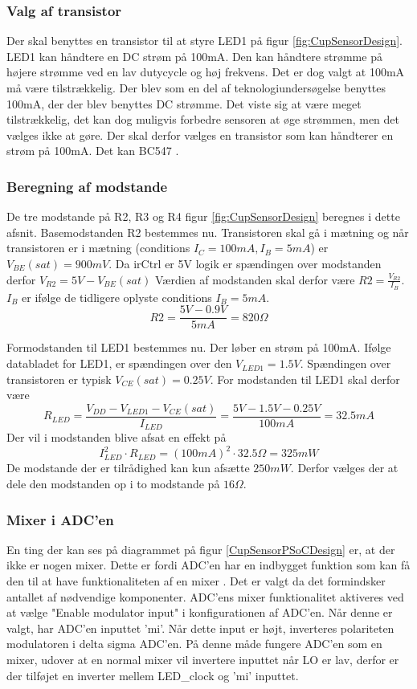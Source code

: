 \documentclass[HardwareDesign/HardwareDesign_main.tex]{subfiles}
\begin{document}
\subsubsection{Valg af transistor}
Der skal benyttes en transistor til at styre LED1 på figur \ref{fig:CupSensorDesign}. LED1 kan håndtere en DC strøm på 100mA\autocite[7]{SFH485}. Den kan håndtere strømme på højere strømme ved en lav dutycycle og høj frekvens. Det er dog valgt at 100mA må være tilstrækkelig. Der blev som en del af teknologiundersøgelse benyttes 100mA, der der blev benyttes DC strømme. Det viste sig at være meget tilstrækkelig, det kan dog muligvis forbedre sensoren at øge strømmen, men det vælges ikke at gøre. 
Der skal derfor vælges en transistor som kan håndterer en strøm på 100mA. Det kan BC547 \autocite[2]{BC547}.

\subsubsection{Beregning af modstande}
De tre modstande på R2, R3 og R4 figur \ref{fig:CupSensorDesign} beregnes i dette afsnit. Basemodstanden R2 bestemmes nu. Transistoren skal gå i mætning og når transistoren er i mætning (conditions $I_C = 100\si{mA}, I_B = 5\si{mA}$) er $V_{BE}(sat)=900mV$\autocite[2]{BC547}. Da irCtrl er 5V logik er spændingen over modstanden derfor $V_{R2} = 5\si{V}-V_{BE}(sat)$
Værdien af modstanden skal derfor være $R2 = \frac{V_{R2}}{I_B}$. $I_B$ er ifølge de tidligere oplyste conditions $I_B = 5\si{mA}$.
$$R2=\frac{5\si{V} - 0.9\si{V}}{5\si{mA}} = 820\si{\Omega}$$

Formodstanden til LED1 bestemmes nu. Der løber en strøm på 100mA. Ifølge databladet for LED1, er spændingen over den $V_{LED1} = 1.5\si{V}$. Spændingen over transistoren er typisk $V_{CE}(sat) = 0.25\si{V}$. For modstanden til LED1 skal derfor være 
$$R_{LED} = \frac{V_{DD} - V_{LED1} - V_{CE}(sat)}{I_{LED}} = \frac{5\si{V}- 1.5\si{V} - 0.25\si{V}}{100\si{mA}} = 32.5\si{mA}$$
Der vil i modstanden blive afsat en effekt på $$I_{LED}^2 \cdot R_{LED} = \left(100\si{mA}\right)^2 \cdot 32.5\si{\Omega} = 325\si{mW}$$
De modstande der er tilrådighed kan kun afsætte $250\si{mW}$. Derfor vælges der at dele den modstanden op i to modstande på $16\si{\Omega}$.

\subsubsection{Mixer i ADC'en}
En ting der kan ses på diagrammet på figur \ref{CupSensorPSoCDesign} er, at der ikke er nogen mixer. Dette er fordi ADC'en har en indbygget funktion som kan få den til at have funktionaliteten af en mixer \autocite[3]{ADC-DelSig-datasheet}. Det er valgt da det formindsker antallet af nødvendige komponenter. ADC'ens mixer funktionalitet aktiveres ved at vælge "Enable modulator input" i konfigurationen af ADC'en. Når denne er valgt, har ADC'en inputtet 'mi'. Når dette input er højt, inverteres polariteten modulatoren i delta sigma ADC'en. På denne måde fungere ADC'en som en mixer, udover at en normal mixer vil invertere inputtet når LO er lav, derfor er der tilføjet en inverter mellem LED\_clock og 'mi' inputtet.
\end{document}

